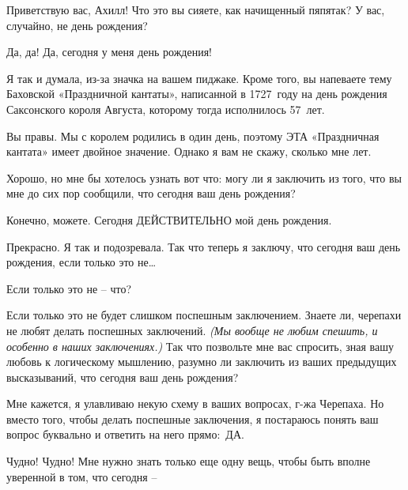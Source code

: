 \documentclass[../main.tex]{subfiles}
\begin{document}


\begin{dialogue}

 Приветствую вас, Ахилл! Что это вы сияете, как начищенный пяпятак? У вас, случайно, не день рождения?

 Да, да! Да, сегодня у меня день рождения!

 Я так и думала, из-за значка на вашем пиджаке. Кроме того, вы напеваете тему Баховской «Праздничной кантаты», написанной в 1727~году на день рождения Саксонского короля Августа, которому тогда исполнилось 57~лет.

 Вы правы. Мы с королем родились в один день, поэтому ЭТА «Праздничная кантата» имеет двойное значение. Однако я вам не скажу, сколько мне лет.

 Хорошо, но мне бы хотелось узнать вот что: могу ли я заключить из того, что вы мне до сих пор сообщили, что сегодня ваш день рождения?

 Конечно, можете. Сегодня ДЕЙСТВИТЕЛЬНО мой день рождения.

 Прекрасно. Я так и подозревала. Так что теперь я заключу, что сегодня ваш день рождения, если только это не\ldots{}

 Если только это не \--- что?

 Если только это не будет слишком поспешным заключением. Знаете ли, черепахи не любят делать поспешных заключений. \emph{(Мы вообще не любим спешить, и особенно в наших заключениях.)} Так что позвольте мне вас спросить, зная вашу любовь к логическому мышлению, разумно ли заключить из ваших предыдущих высказываний, что сегодня ваш день рождения?

 Мне кажется, я улавливаю некую схему в ваших вопросах, г-жа Черепаха. Но вместо того, чтобы делать поспешные заключения, я постараюсь понять ваш вопрос буквально и ответить на него прямо:~ДА.

 Чудно! Чудно! Мне нужно знать только еще одну вещь, чтобы быть вполне уверенной в том, что сегодня \---


\end{dialogue}
\end{document}

